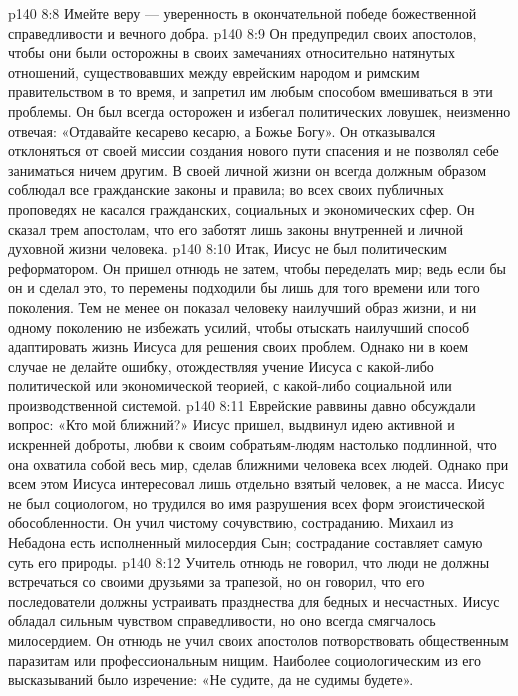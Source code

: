 \vs p140 8:8 Имейте веру --- уверенность в окончательной победе божественной справедливости и вечного добра.
\vs p140 8:9 \bibnobreakspace {} Он предупредил своих апостолов, чтобы они были осторожны в своих замечаниях относительно натянутых отношений, существовавших между еврейским народом и римским правительством в то время, и запретил им любым способом вмешиваться в эти проблемы. Он был всегда осторожен и избегал политических ловушек, неизменно отвечая: «Отдавайте кесарево кесарю, а Божье Богу». Он отказывался отклоняться от своей миссии создания нового пути спасения и не позволял себе заниматься ничем другим. В своей личной жизни он всегда должным образом соблюдал все гражданские законы и правила; во всех своих публичных проповедях не касался гражданских, социальных и экономических сфер. Он сказал трем апостолам, что его заботят лишь законы внутренней и личной духовной жизни человека.
\vs p140 8:10 Итак, Иисус не был политическим реформатором. Он пришел отнюдь не затем, чтобы переделать мир; ведь если бы он и сделал это, то перемены подходили бы лишь для того времени или того поколения. Тем не менее он показал человеку наилучший образ жизни, и ни одному поколению не избежать усилий, чтобы отыскать наилучший способ адаптировать жизнь Иисуса для решения своих проблем. Однако ни в коем случае не делайте ошибку, отождествляя учение Иисуса с какой\hyp{}либо политической или экономической теорией, с какой\hyp{}либо социальной или производственной системой.
\vs p140 8:11 \bibnobreakspace {}  Еврейские раввины давно обсуждали вопрос: «Кто мой ближний?» Иисус пришел, выдвинул идею активной и искренней доброты, любви к своим собратьям\hyp{}людям настолько подлинной, что она охватила собой весь мир, сделав ближними человека всех людей. Однако при всем этом Иисуса интересовал лишь отдельно взятый человек, а не масса. Иисус не был социологом, но трудился во имя разрушения всех форм эгоистической обособленности. Он учил чистому сочувствию, состраданию. Михаил из Небадона есть исполненный милосердия Сын; сострадание составляет самую суть его природы.
\vs p140 8:12 Учитель отнюдь не говорил, что люди не должны встречаться со своими друзьями за трапезой, но он говорил, что его последователи должны устраивать празднества для бедных и несчастных. Иисус обладал сильным чувством справедливости, но оно всегда смягчалось милосердием. Он отнюдь не учил своих апостолов потворствовать общественным паразитам или профессиональным нищим. Наиболее социологическим из его высказываний было изречение: «Не судите, да не судимы будете».
